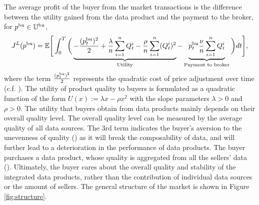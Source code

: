 \documentclass[11pt]{article}
\numberwithin{equation}{section}
\begin{document}
The average profit of the buyer from the market transactions is the difference between the utility gained from the data product and the payment to the broker, for $p^{{\rm bu}}\in \mathbb{U}^{\rm bu}$,
	\begin{align}\label{eq:JLpbu}
		J^L(p^{{\rm bu}})=\mathbb{E}\Bigg[\int_0^T\bigg(\underbrace{-\frac{(p_t^{{\rm bu}})^2}{2}+\frac{\lambda}{n}\sum_{i=1}^nQ_t^i-\frac{\rho}{n}\sum_{i=1}^n( Q_t^i)^2}_{\text{Utility}}-\underbrace{p_t^{{\rm bu}}\frac{\nu}{n}\sum_{i=1}^n Q_t^i}_{\text{Payment to broker}}\bigg)dt\Bigg],
	\end{align} 
where the term $\frac{(p_t^{\rm bu})^2}{2}$ represents the quadratic cost of price adjustment over time (c.f. \cite{R82}).  The utility of product quality to buyers is formulated as a quadratic function of the form $U(x):= \lambda x-\rho x^2$ with the slope parameters $\lambda>0$ and $\rho>0$. The utility that buyers obtain from data products mainly depends on their overall quality level. The overall quality level can be measured by the average quality of all data sources. The 3rd term indicates the buyer's aversion to the unevenness of quality (\cite{CL15}) as it will break the composability of data, and will further lead to a deterioration in the performance of data products. The buyer purchases a data product, whose quality is aggregated from all the sellers' data (\cite{BL24}). Ultimately, the buyer cares about the overall quality and stability of the integrated data products, rather than the contribution of individual data sources or the amount of sellers. The general structure of the market is shown in Figure \ref{fig:structure}. 
	
\end{document}
